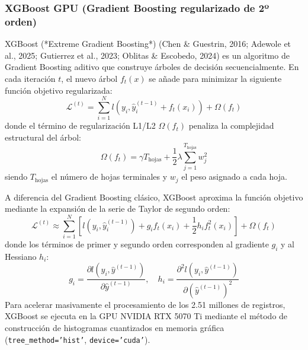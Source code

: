 \subsubsection{XGBoost GPU (Gradient Boosting regularizado de 2º orden)}
XGBoost (*Extreme Gradient Boosting*) (Chen \& Guestrin, 2016; Adewole et al., 2025; Gutierrez et al., 2023; Oblitas \& Escobedo, 2024) es un algoritmo de Gradient Boosting aditivo que construye árboles de decisión secuencialmente. En cada iteración $t$, el nuevo árbol $f_t(x)$ se añade para minimizar la siguiente función objetivo regularizada:
\begin{equation}
\mathcal{L}^{(t)} = \sum_{i=1}^N l\left(y_i, \hat{y}_i^{(t-1)} + f_t(x_i)\right) + \Omega(f_t)
\end{equation}
donde el término de regularización L1/L2 $\Omega(f_t)$ penaliza la complejidad estructural del árbol:
\begin{equation}
\Omega(f_t) = \gamma T_{\mathrm{hojas}} + \frac{1}{2}\lambda \sum_{j=1}^{T_{\mathrm{hojas}}} w_j^2
\end{equation}
siendo $T_{\mathrm{hojas}}$ el número de hojas terminales y $w_j$ el peso asignado a cada hoja.

A diferencia del Gradient Boosting clásico, XGBoost aproxima la función objetivo mediante la expansión de la serie de Taylor de segundo orden:
\begin{equation}
\mathcal{L}^{(t)} \approx \sum_{i=1}^N \left[ l(y_i, \hat{y}_i^{(t-1)}) + g_i f_t(x_i) + \frac{1}{2} h_i f_t^2(x_i) \right] + \Omega(f_t)
\end{equation}
donde los términos de primer y segundo orden corresponden al gradiente $g_i$ y al Hessiano $h_i$:
\begin{equation}
g_i = \frac{\partial l(y_i, \hat{y}^{(t-1)})}{\partial \hat{y}^{(t-1)}}, \quad h_i = \frac{\partial^2 l(y_i, \hat{y}^{(t-1)})}{\partial (\hat{y}^{(t-1)})^2}
\end{equation}
Para acelerar masivamente el procesamiento de los 2.51 millones de registros, XGBoost se ejecuta en la GPU NVIDIA RTX 5070 Ti mediante el método de construcción de histogramas cuantizados en memoria gráfica (\texttt{tree\_method='hist'}, \texttt{device='cuda'}).

